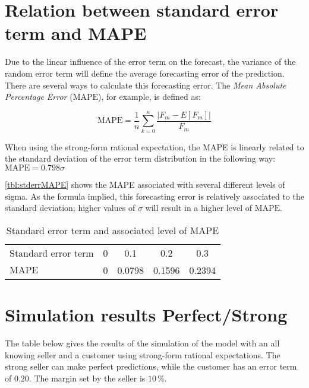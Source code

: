 \chapter{Relation between standard error term and MAPE}
\label{app:errorMAPE}
Due to the linear influence of the error term on the forecast, the variance of the random error term will define the average forecasting error of the prediction. There are several ways to calculate this forecasting error. The \emph{Mean Absolute Percentage Error} ($\mbox{MAPE}$), for example, is defined as:

$$ \mbox{MAPE} = \frac{1}{n} \sum\limits_{k=0}^n \frac{|F_m - E[F_m]|}{F_m} $$

When using the strong-form rational expectation, the MAPE is linearly related to the standard deviation of the error term distribution in the following way: $ \mbox{MAPE} = 0.798 \sigma $

\autoref{tbl:stderrMAPE} shows the MAPE associated with several different levels of sigma. As the formula implied, this forecasting error is relatively associated to the standard deviation; higher values of $\sigma$ will result in a higher level of $\mbox{MAPE}$.


\begin{table}[h]
\centering
\begin{tabular}{l c c c c}
\toprule

Standard error term  &  0  &  0.1  &  0.2  &  0.3  \\
$\mbox{MAPE}$        &  0  &  0.0798  &  0.1596  &  0.2394  \\
\bottomrule
\end{tabular}
\caption{Standard error term and associated level of MAPE}
\label{tbl:stderrMAPE}
\end{table}



\chapter{Simulation results Perfect/Strong}
\label{app:SimulationResultsPerfectStrong}
The table below gives the results of the simulation of the model with an all knowing seller and a customer using strong-form rational expectations. The strong seller can make perfect predictions, while the customer has an error term of $0.20$. The margin set by the seller is $10\,\%$.

